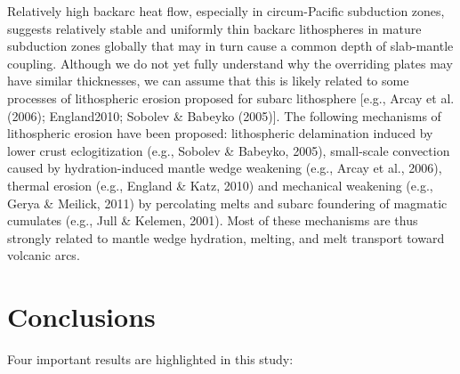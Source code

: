 \documentclass[draft,linenumbers]{agujournal2018}
\begin{document}
Relatively high backarc heat flow, especially in circum-Pacific
subduction zones, suggests relatively stable and uniformly thin backarc
lithospheres in mature subduction zones globally that may in turn cause
a common depth of slab-mantle coupling. Although we do not yet fully
understand why the overriding plates may have similar thicknesses, we
can assume that this is likely related to some processes of lithospheric
erosion proposed for subarc lithosphere {[}e.g., Arcay et al. (2006);
England2010; Sobolev \& Babeyko (2005){]}. The following mechanisms of
lithospheric erosion have been proposed: lithospheric delamination
induced by lower crust eclogitization (e.g., Sobolev \& Babeyko, 2005),
small-scale convection caused by hydration-induced mantle wedge
weakening (e.g., Arcay et al., 2006), thermal erosion (e.g., England \&
Katz, 2010) and mechanical weakening (e.g., Gerya \& Meilick, 2011) by
percolating melts and subarc foundering of magmatic cumulates (e.g.,
Jull \& Kelemen, 2001). Most of these mechanisms are thus strongly
related to mantle wedge hydration, melting, and melt transport toward
volcanic arcs.

\section{Conclusions}

Four important results are highlighted in this study:
\end{document}
